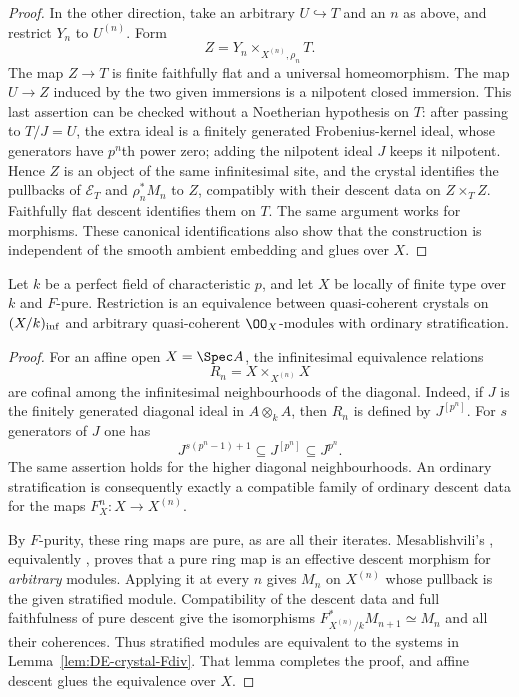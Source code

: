 \begin{proof}
In the other direction, take an arbitrary $U\hookrightarrow T$ and an $n$ as above, and restrict $Y_n$ to $U^{(n)}$.  Form
\[
       Z=Y_n\times_{X^{(n)},\rho_n}T.
\]
The map $Z\to T$ is finite faithfully flat and a universal homeomorphism.  The map $U\to Z$ induced by the two given immersions is a nilpotent closed immersion.  This last assertion can be checked without a Noetherian hypothesis on $T$: after passing to $T/J=U$, the extra ideal is a finitely generated Frobenius-kernel ideal, whose generators have $p^n$th power zero; adding the nilpotent ideal $J$ keeps it nilpotent.  Hence $Z$ is an object of the same infinitesimal site, and the crystal identifies the pullbacks of $\mathcal E_T$ and $\rho_n^*M_n$ to $Z$, compatibly with their descent data on $Z\times_T Z$.  Faithfully flat descent identifies them on $T$.  The same argument works for morphisms.  These canonical identifications also show that the construction is independent of the smooth ambient embedding and glues over $X$.
\end{proof}

\begin{proposition}\label{prop:DE-E2-Fpure}
Let $k$ be a perfect field of characteristic $p$, and let $X$ be locally of finite type over $k$ and $F$-pure.  Restriction is an equivalence between quasi-coherent crystals on $(X/k)_{\rm inf}$ and arbitrary quasi-coherent $\OO_X$-modules with ordinary stratification.
\end{proposition}
\begin{proof}
For an affine open $X=\Spec A$, the infinitesimal equivalence relations
\[
       R_n=X\times_{X^{(n)}}X
\]
are cofinal among the infinitesimal neighbourhoods of the diagonal.  Indeed, if $J$ is the finitely generated diagonal ideal in $A\otimes_k A$, then $R_n$ is defined by $J^{[p^n]}$.  For $s$ generators of $J$ one has
\[
       J^{s(p^n-1)+1}\subseteq J^{[p^n]}\subseteq J^{p^n}.
\]
The same assertion holds for the higher diagonal neighbourhoods.  An ordinary stratification is consequently exactly a compatible family of ordinary descent data for the maps $F_X^n:X\to X^{(n)}$.

By $F$-purity, these ring maps are pure, as are all their iterates.  Mesablishvili's \cite[Theorem~4]{Mesablishvili2000}, equivalently \cite[Theorem~35.4.22, Tag~08WE]{StacksProject}, proves that a pure ring map is an effective descent morphism for \emph{arbitrary} modules.  Applying it at every $n$ gives $M_n$ on $X^{(n)}$ whose pullback is the given stratified module.  Compatibility of the descent data and full faithfulness of pure descent give the isomorphisms
$F_{X^{(n)}/k}^*M_{n+1}\simeq M_n$ and all their coherences.  Thus stratified modules are equivalent to the systems in Lemma~\ref{lem:DE-crystal-Fdiv}.  That lemma completes the proof, and affine descent glues the equivalence over $X$.
\end{proof}

